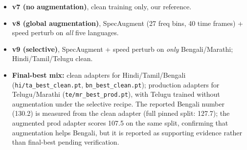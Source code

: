 \documentclass[11pt,a4paper]{article}
\begin{document}
\begin{itemize}[leftmargin=1.2em, itemsep=2pt]
  \item \textbf{v7 (no augmentation)}, clean training only, our reference.
  \item \textbf{v8 (global augmentation)}, SpecAugment (27 freq bins, 40 time frames) + speed perturb on \emph{all} five languages.
  \item \textbf{v9 (selective)}, SpecAugment + speed perturb on
  \emph{only} Bengali/Marathi; Hindi/Tamil/Telugu clean.
\item \textbf{Final-best mix:} clean adapters for Hindi/Tamil/Bengali
  (\texttt{hi/ta\_best\_clean.pt}, \texttt{bn\_best\_clean.pt});
  production adapters for Telugu/Marathi
  (\texttt{te/mr\_best\_prod.pt}), with Telugu trained without
  augmentation under the selective recipe.
  The reported Bengali number (130.2) is measured from the clean
  adapter (full pinned split: 127.7); the augmented prod adapter
  scores 107.5 on the same split, confirming that augmentation
  helps Bengali, but it is reported as supporting evidence rather
  than final-best pending verification.
\end{itemize}
\end{document}

